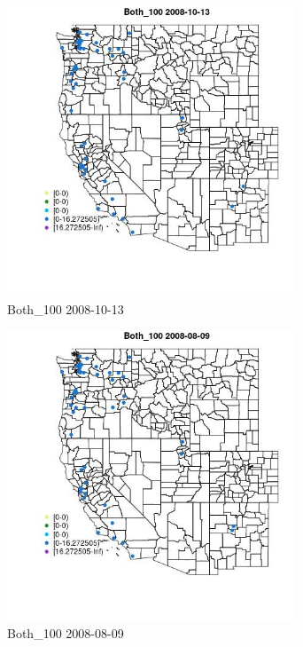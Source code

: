 \begin{figure} 
\centering  
\includegraphics[width=0.77\textwidth]{Code_Outputs/Report_ML_input_PM25_Step4_part_e_de_duplicated_aves_MapObsBoth_1002008-10-13.jpg} 
\caption{\label{fig:Report_ML_input_PM25_Step4_part_e_de_duplicated_avesMapObsBoth_1002008-10-13}Both_100 2008-10-13} 
\end{figure} 
 

\begin{figure} 
\centering  
\includegraphics[width=0.77\textwidth]{Code_Outputs/Report_ML_input_PM25_Step4_part_e_de_duplicated_aves_MapObsBoth_1002008-08-09.jpg} 
\caption{\label{fig:Report_ML_input_PM25_Step4_part_e_de_duplicated_avesMapObsBoth_1002008-08-09}Both_100 2008-08-09} 
\end{figure} 
 

